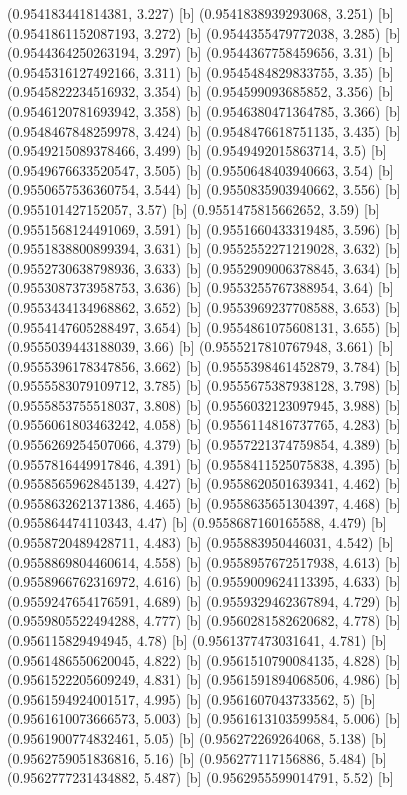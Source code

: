 {{{(0.954183441814381, 3.227) [b] 
(0.9541838939293068, 3.251) [b] 
(0.9541861152087193, 3.272) [b] 
(0.9544355479772038, 3.285) [b] 
(0.9544364250263194, 3.297) [b] 
(0.9544367758459656, 3.31) [b] 
(0.9545316127492166, 3.311) [b] 
(0.9545484829833755, 3.35) [b] 
(0.9545822234516932, 3.354) [b] 
(0.954599093685852, 3.356) [b] 
(0.9546120781693942, 3.358) [b] 
(0.9546380471364785, 3.366) [b] 
(0.9548467848259978, 3.424) [b] 
(0.9548476618751135, 3.435) [b] 
(0.9549215089378466, 3.499) [b] 
(0.9549492015863714, 3.5) [b] 
(0.9549676633520547, 3.505) [b] 
(0.9550648403940663, 3.54) [b] 
(0.9550657536360754, 3.544) [b] 
(0.9550835903940662, 3.556) [b] 
(0.955101427152057, 3.57) [b] 
(0.9551475815662652, 3.59) [b] 
(0.9551568124491069, 3.591) [b] 
(0.9551660433319485, 3.596) [b] 
(0.9551838800899394, 3.631) [b] 
(0.9552552271219028, 3.632) [b] 
(0.9552730638798936, 3.633) [b] 
(0.9552909006378845, 3.634) [b] 
(0.9553087373958753, 3.636) [b] 
(0.9553255767388954, 3.64) [b] 
(0.9553434134968862, 3.652) [b] 
(0.9553969237708588, 3.653) [b] 
(0.9554147605288497, 3.654) [b] 
(0.9554861075608131, 3.655) [b] 
(0.9555039443188039, 3.66) [b] 
(0.9555217810767948, 3.661) [b] 
(0.9555396178347856, 3.662) [b] 
(0.9555398461452879, 3.784) [b] 
(0.9555583079109712, 3.785) [b] 
(0.9555675387938128, 3.798) [b] 
(0.9555853755518037, 3.808) [b] 
(0.9556032123097945, 3.988) [b] 
(0.9556061803463242, 4.058) [b] 
(0.9556114816737765, 4.283) [b] 
(0.9556269254507066, 4.379) [b] 
(0.9557221374759854, 4.389) [b] 
(0.9557816449917846, 4.391) [b] 
(0.9558411525075838, 4.395) [b] 
(0.9558565962845139, 4.427) [b] 
(0.9558620501639341, 4.462) [b] 
(0.9558632621371386, 4.465) [b] 
(0.9558635651304397, 4.468) [b] 
(0.955864474110343, 4.47) [b] 
(0.9558687160165588, 4.479) [b] 
(0.9558720489428711, 4.483) [b] 
(0.955883950446031, 4.542) [b] 
(0.9558869804460614, 4.558) [b] 
(0.9558957672517938, 4.613) [b] 
(0.9558966762316972, 4.616) [b] 
(0.9559009624113395, 4.633) [b] 
(0.9559247654176591, 4.689) [b] 
(0.9559329462367894, 4.729) [b] 
(0.9559805522494288, 4.777) [b] 
(0.9560281582620682, 4.778) [b] 
(0.956115829494945, 4.78) [b] 
(0.9561377473031641, 4.781) [b] 
(0.9561486550620045, 4.822) [b] 
(0.9561510790084135, 4.828) [b] 
(0.9561522205609249, 4.831) [b] 
(0.9561591894068506, 4.986) [b] 
(0.9561594924001517, 4.995) [b] 
(0.9561607043733562, 5) [b] 
(0.9561610073666573, 5.003) [b] 
(0.9561613103599584, 5.006) [b] 
(0.9561900774832461, 5.05) [b] 
(0.956272269264068, 5.138) [b] 
(0.9562759051836816, 5.16) [b] 
(0.956277117156886, 5.484) [b] 
(0.9562777231434882, 5.487) [b] 
(0.9562955599014791, 5.52) [b] 
}}}
